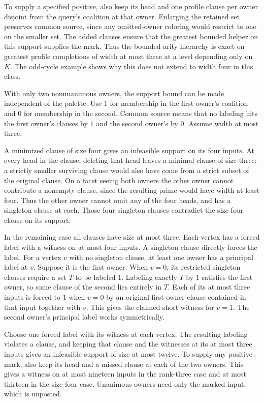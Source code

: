 To supply a specified positive, also keep its head and one
profile clause per owner disjoint from the query's coalition
at that owner. Enlarging the retained set preserves common
source, since any omitted-owner coloring would restrict to
one on the smaller set. The added clauses ensure that the
greatest bounded helper on this support supplies the mark.
Thus the bounded-arity hierarchy is exact on greatest profile
completions of width at most three at a level depending only
on $K$. The odd-cycle example shows why this does not extend
to width four in this class.

With only two nonunanimous owners, the support bound
can be made independent of the palette. Use $1$ for
membership in the first owner's coalition and $0$ for
membership in the second. Common source means that
no labeling hits the first owner's clauses by $1$ and
the second owner's by $0$. Assume width at most three.

A minimized clause of size four gives an infeasible
support on its four inputs. At every head in the
clause, deleting that head leaves a minimal clause
of size three: a strictly smaller surviving clause
would also have come from a strict subset of the
original clause. On a facet seeing both owners the
other owner cannot contribute a nonempty clause,
since the resulting prime would have width at least
four. Thus the other owner cannot omit any of the
four heads, and has a singleton clause at each. Those
four singleton clauses contradict the size-four clause
on its support.

In the remaining case all clauses have size at most
three. Each vertex has a forced label with a witness
on at most four inputs. A singleton clause directly
forces the label. For a vertex $v$ with no singleton
clause, at least one owner has a principal label at
$v$. Suppose it is the first owner. When $v=0$, its
restricted singleton clauses require a set $T$ to be
labeled $1$. Labeling exactly $T$ by $1$ satisfies
the first owner, so some clause of the second lies
entirely in $T$. Each of its at most three inputs
is forced to $1$ when $v=0$ by an original first-owner
clause contained in that input together with $v$.
This gives the claimed short witness for $v=1$.
The second owner's principal label works symmetrically.

Choose one forced label with its witness at each
vertex. The resulting labeling violates a clause,
and keeping that clause and the witnesses at its
at most three inputs gives an infeasible support of
size at most twelve. To supply any positive mark,
also keep its head and a missed clause at each of
the two owners. This gives a witness on at most
nineteen inputs in the rank-three case and at most
thirteen in the size-four case. Unanimous owners need
only the marked input, which is unposted.

